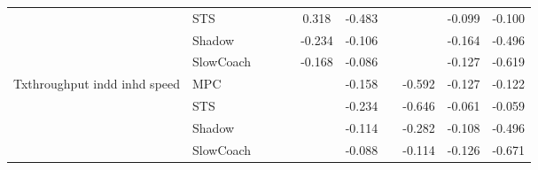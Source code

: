 \begin{tabular}{|l|l|*{9}{c|}}
                              & STS &       &        &        &  0.318 & -0.483 &     &      &  -0.099 &   -0.100 \\
                              & Shadow &       &        &        & -0.234 & -0.106 &     &      &  -0.164 &   -0.496 \\
                              & SlowCoach &       &        &        & -0.168 & -0.086 &     &      &  -0.127 &   -0.619 \\
\midrule
Txthroughput indd inhd speed    & MPC &       &        &        &     & -0.158 &     &  -0.592 &  -0.127 &   -0.122 \\
                              & STS &       &        &        &     & -0.234 &     &  -0.646 &  -0.061 &   -0.059 \\
                              & Shadow &       &        &        &     & -0.114 &     &  -0.282 &  -0.108 &   -0.496 \\
                              & SlowCoach &       &        &        &     & -0.088 &     &  -0.114 &  -0.126 &   -0.671 \\
\bottomrule
\end{tabular}
